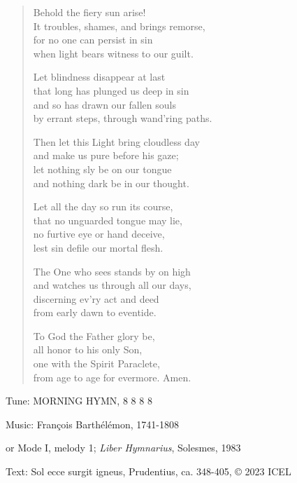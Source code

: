 \hymn

\begin{verse}
Behold the fiery sun arise!\\
It troubles, shames, and brings remorse,\\
for no one can persist in sin\\
when light bears witness to our guilt.

Let blindness disappear at last\\
that long has plunged us deep in sin\\
and so has drawn our fallen souls\\
by errant steps, through wand’ring paths.

Then let this Light bring cloudless day\\
and make us pure before his gaze;\\
let nothing sly be on our tongue\\
and nothing dark be in our thought.

Let all the day so run its course,\\
that no unguarded tongue may lie,\\
no furtive eye or hand deceive,\\
lest sin defile our mortal flesh.

The One who sees stands by on high\\
and watches us through all our days,\\
discerning ev’ry act and deed\\
from early dawn to eventide.

To God the Father glory be,\\
all honor to his only Son,\\
one with the Spirit Paraclete,\\
from age to age for evermore. Amen.
\end{verse}

\begin{hymnsource}
Tune: MORNING HYMN, 8 8 8 8

Music: François Barthélémon, 1741-1808

or Mode I, melody 1; \emph{Liber Hymnarius}, Solesmes, 1983

Text: Sol ecce surgit igneus, Prudentius, ca. 348-405, © 2023 ICEL
\end{hymnsource}